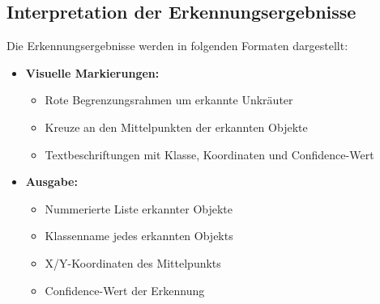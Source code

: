 \documentclass[12pt, a4paper]{scrreprt}
\begin{document}
\subsection{Interpretation der Erkennungsergebnisse}
Die Erkennungsergebnisse werden in folgenden Formaten dargestellt:
\begin{itemize}
    \item \textbf{Visuelle Markierungen:}
    \begin{itemize}
        \item Rote Begrenzungsrahmen um erkannte Unkräuter
        \item Kreuze an den Mittelpunkten der erkannten Objekte
        \item Textbeschriftungen mit Klasse, Koordinaten und Confidence-Wert
    \end{itemize}
    \item \textbf{Ausgabe:}
    \begin{itemize}
        \item Nummerierte Liste erkannter Objekte
        \item Klassenname jedes erkannten Objekts
        \item X/Y-Koordinaten des Mittelpunkts
        \item Confidence-Wert der Erkennung
    \end{itemize}
\end{itemize}
\end{document}
